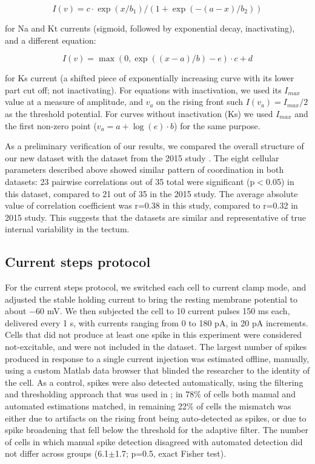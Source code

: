 \documentclass{article}
\begin{document}
$$I(v) = c \cdot \exp(x/b_1)/(1+\exp(-(a-x)/b_2))$$ 

\noindent for Na and Kt currents (sigmoid, followed by exponential decay, inactivating), and a different equation: 

$$I(v)=\max(0,\exp((x-a)/b)-e)\cdot c+d$$ 

\noindent for Ks current (a shifted piece of exponentially increasing curve with its lower part cut off; not inactivating). For equations with inactivation, we used its $I_{max}$ value at a measure of amplitude, and $v_a$ on the rising front such $I(v_a)=I_{max}/2$ as the threshold potential. For curves without inactivation (Ks) we used $I_{max}$ and the first non-zero point ($v_a=a+\log(e)\cdot b$) for the same purpose.

As a preliminary verification of our results, we compared the overall structure of our new dataset with the dataset from the 2015 study \citep{ciarleglio2015}. The eight cellular parameters described above showed similar pattern of coordination in both datasets: 23 pairwise correlations out of 35 total were significant (p$<$0.05) in this dataset, compared to 21 out of 35 in the 2015 study. The average absolute value of correlation coefficient was r=0.38 in this study, compared to r=0.32 in 2015 study. This suggests that the datasets are similar and representative of true internal variability in the tectum.

\subsection*{Current steps protocol}

For the current steps protocol, we switched each cell to current clamp mode, and adjusted the stable holding current to bring the resting membrane potential to about $-$60 mV. We then subjected the cell to 10 current pulses 150 ms each, delivered every 1 s, with currents ranging from 0 to 180 pA, in 20 pA increments. Cells that did not produce at least one spike in this experiment were considered not-excitable, and were not included in the dataset. The largest number of spikes produced in response to a single current injection was estimated offline, manually, using a custom Matlab data browser that blinded the researcher to the identity of the cell. As a control, spikes were also detected automatically, using the filtering and thresholding approach that was used in \citep{ciarleglio2015}; in 78\% of cells both manual and automated estimations matched, in remaining 22\% of cells the mismatch was either due to artifacts on the rising front being auto-detected as spikes, or due to spike broadening that fell below the threshold for the adaptive filter. The number of cells in which manual spike detection disagreed with automated detection did not differ across groups (6.1$\pm$1.7; p=0.5, exact Fisher test).
\end{document}
